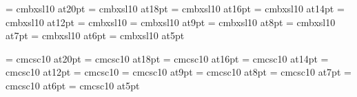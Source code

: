 \font\twentyslbf=      cmbxsl10 at20pt
\font\eighteenslbf=    cmbxsl10 at18pt
\font\sixteenslbf=     cmbxsl10 at16pt
\font\fourteenslbf=    cmbxsl10 at14pt
\font\twelveslbf=      cmbxsl10 at12pt
\font\slbf=            cmbxsl10
\font\nineslbf=        cmbxsl10 at9pt
\font\eightslbf=       cmbxsl10 at8pt
\font\sevenslbf=       cmbxsl10 at7pt
\font\sixslbf=         cmbxsl10 at6pt
\font\fiveslbf=        cmbxsl10 at5pt

\font\twentycaps=      cmcsc10 at20pt
\font\eighteencaps=    cmcsc10 at18pt
\font\sixteencaps=     cmcsc10 at16pt
\font\fourteencaps=    cmcsc10 at14pt
\font\twelvecaps=      cmcsc10 at12pt
\font\caps=            cmcsc10
\font\ninecaps=        cmcsc10 at9pt
\font\eightcaps=       cmcsc10 at8pt
\font\sevencaps=       cmcsc10 at7pt
\font\sixcaps=         cmcsc10 at6pt
\font\fivecaps=        cmcsc10 at5pt

\rm 